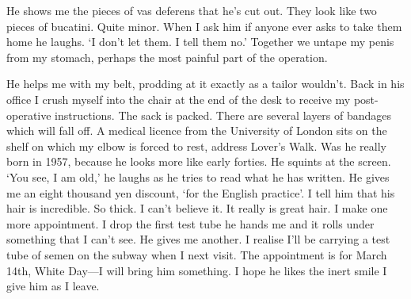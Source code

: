 \documentclass[12pt,a4paper,onecolumn]{letter}
\begin{document}
He shows me the pieces of vas deferens that he's cut out. They look like two pieces of bucatini. Quite minor. When I ask him if anyone ever asks to take them home he laughs. `I don't let them. I tell them no.' Together we untape my penis from my stomach, perhaps the most painful part of the operation.

He helps me with my belt, prodding at it exactly as a tailor wouldn't. Back in his office I crush myself into the chair at the end of the desk to receive my post-operative instructions. The sack is packed. There are several layers of bandages which will fall off. A medical licence from the University of London sits on the shelf on which my elbow is forced to rest, address Lover's Walk. Was he really born in 1957, because he looks more like early forties. He squints at the screen. `You see, I am old,' he laughs as he tries to read what he has written. He gives me an eight thousand yen discount, `for the English practice'. I tell him that his hair is incredible. So thick. I can't believe it. It really is great hair. I make one more appointment. I drop the first test tube he hands me and it rolls under something that I can't see. He gives me another. I realise I'll be carrying a test tube of semen on the subway when I next visit. The appointment is for March 14th, White Day---I will bring him something. I hope he likes the inert smile I give him as I leave.
\end{document}
